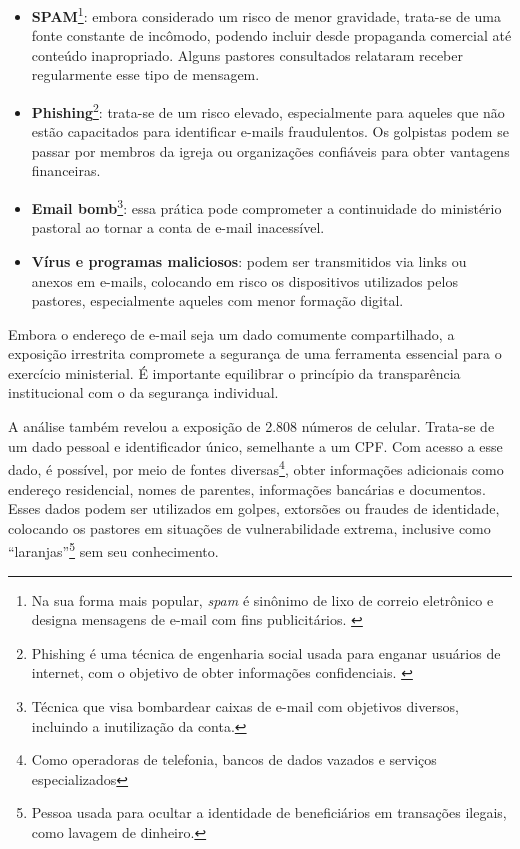\begin{itemize}
    \item \textbf{SPAM}\footnote{Na sua forma mais popular, \textit{spam} é sinônimo de lixo de correio eletrônico e designa mensagens de e-mail com fins publicitários. \cite{wiki_spam}}: embora considerado um risco de menor gravidade, trata-se de uma fonte constante de incômodo, podendo incluir desde propaganda comercial até conteúdo inapropriado. Alguns pastores consultados relataram receber regularmente esse tipo de mensagem.
    
    \item \textbf{Phishing}\footnote{Phishing é uma técnica de engenharia social usada para enganar usuários de internet, com o objetivo de obter informações confidenciais. \cite{wiki_phishing}}: trata-se de um risco elevado, especialmente para aqueles que não estão capacitados para identificar e-mails fraudulentos. Os golpistas podem se passar por membros da igreja ou organizações confiáveis para obter vantagens financeiras.
    
    \item \textbf{Email bomb}\footnote{Técnica que visa bombardear caixas de e-mail com objetivos diversos, incluindo a inutilização da conta.\cite{wiki_emailbomb}}: essa prática pode comprometer a continuidade do ministério pastoral ao tornar a conta de e-mail inacessível.
    
    \item \textbf{Vírus e programas maliciosos}: podem ser transmitidos via links ou anexos em e-mails, colocando em risco os dispositivos utilizados pelos pastores, especialmente aqueles com menor formação digital.
\end{itemize}

Embora o endereço de e-mail seja um dado comumente compartilhado, a exposição irrestrita compromete a segurança de uma ferramenta essencial para o exercício ministerial. É importante equilibrar o princípio da transparência institucional com o da segurança individual.

A análise também revelou a exposição de 2.808 números de celular. Trata-se de um dado pessoal e identificador único, semelhante a um CPF. Com acesso a esse dado, é possível, por meio de fontes diversas\footnote{Como operadoras de telefonia, bancos de dados vazados e serviços especializados}, obter informações adicionais como endereço residencial, nomes de parentes, informações bancárias e documentos. Esses dados podem ser utilizados em golpes, extorsões ou fraudes de identidade, colocando os pastores em situações de vulnerabilidade extrema, inclusive como ``laranjas''\footnote{Pessoa usada para ocultar a identidade de beneficiários em transações ilegais, como lavagem de dinheiro.\cite{wiki_laranja}} sem seu conhecimento.

